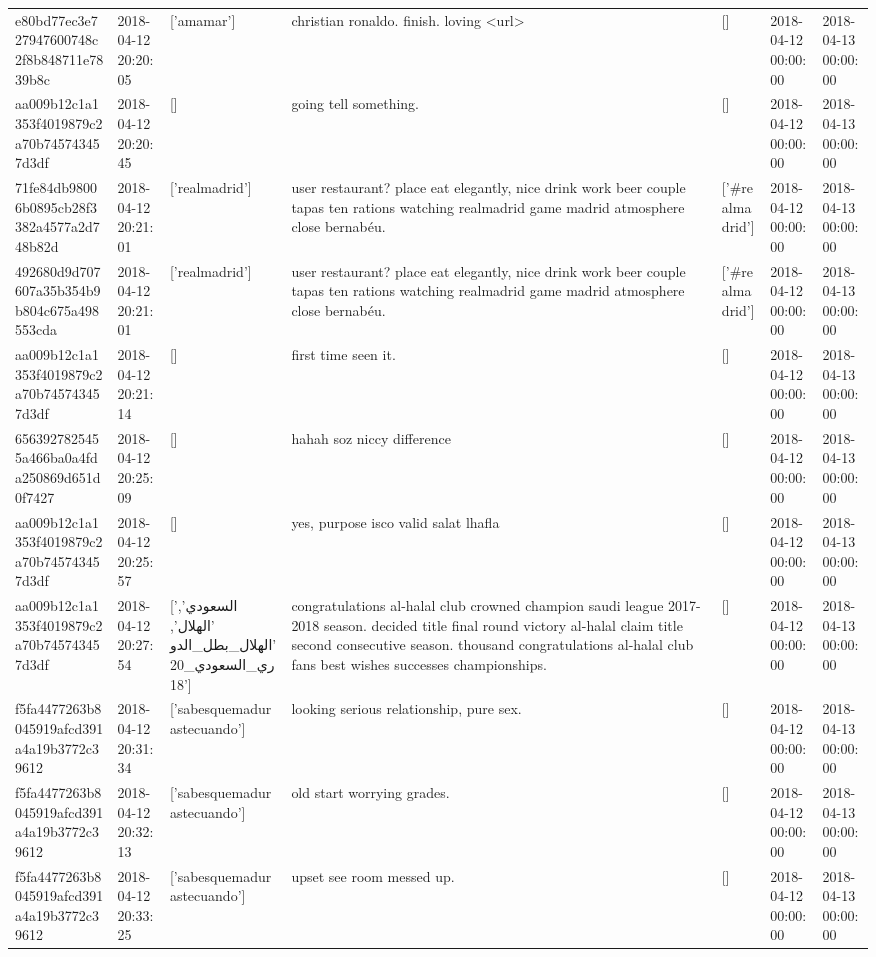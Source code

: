 \begin{tabular}{lllllll}
e80bd77ec3e727947600748c2f8b848711e7839b8c & 2018-04-12 20:20:05 & ['amamar'] & christian ronaldo. finish. loving <url> & [] & 2018-04-12 00:00:00 & 2018-04-13 00:00:00 \\
aa009b12c1a1353f4019879c2a70b745743457d3df & 2018-04-12 20:20:45 & [] & going tell something. & [] & 2018-04-12 00:00:00 & 2018-04-13 00:00:00 \\
71fe84db98006b0895cb28f3382a4577a2d748b82d & 2018-04-12 20:21:01 & ['realmadrid'] & user restaurant? place eat elegantly, nice drink work beer couple tapas ten rations watching realmadrid game madrid atmosphere close bernabéu. & ['#realmadrid'] & 2018-04-12 00:00:00 & 2018-04-13 00:00:00 \\
492680d9d707607a35b354b9b804c675a498553cda & 2018-04-12 20:21:01 & ['realmadrid'] & user restaurant? place eat elegantly, nice drink work beer couple tapas ten rations watching realmadrid game madrid atmosphere close bernabéu. & ['#realmadrid'] & 2018-04-12 00:00:00 & 2018-04-13 00:00:00 \\
aa009b12c1a1353f4019879c2a70b745743457d3df & 2018-04-12 20:21:14 & [] & first time seen it. & [] & 2018-04-12 00:00:00 & 2018-04-13 00:00:00 \\
6563927825455a466ba0a4fda250869d651d0f7427 & 2018-04-12 20:25:09 & [] & hahah soz niccy difference & [] & 2018-04-12 00:00:00 & 2018-04-13 00:00:00 \\
aa009b12c1a1353f4019879c2a70b745743457d3df & 2018-04-12 20:25:57 & [] & yes, purpose isco valid salat lhafla & [] & 2018-04-12 00:00:00 & 2018-04-13 00:00:00 \\
aa009b12c1a1353f4019879c2a70b745743457d3df & 2018-04-12 20:27:54 & ['السعودي', 'الهلال', 'الهلال_بطل_الدوري_السعودي_2018'] & congratulations al-halal club crowned champion saudi league 2017-2018 season. decided title final round victory al-halal claim title second consecutive season. thousand congratulations al-halal club fans best wishes successes championships. & [] & 2018-04-12 00:00:00 & 2018-04-13 00:00:00 \\
f5fa4477263b8045919afcd391a4a19b3772c39612 & 2018-04-12 20:31:34 & ['sabesquemadurastecuando'] & looking serious relationship, pure sex. & [] & 2018-04-12 00:00:00 & 2018-04-13 00:00:00 \\
f5fa4477263b8045919afcd391a4a19b3772c39612 & 2018-04-12 20:32:13 & ['sabesquemadurastecuando'] & old start worrying grades. & [] & 2018-04-12 00:00:00 & 2018-04-13 00:00:00 \\
f5fa4477263b8045919afcd391a4a19b3772c39612 & 2018-04-12 20:33:25 & ['sabesquemadurastecuando'] & upset see room messed up. & [] & 2018-04-12 00:00:00 & 2018-04-13 00:00:00 \\

\end{tabular}
